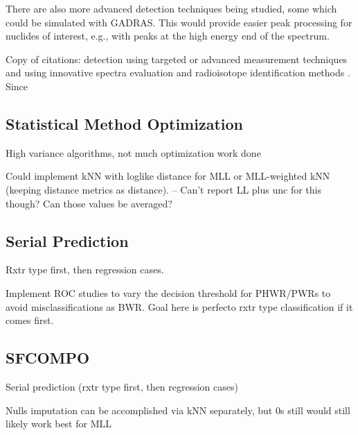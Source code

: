 There are also more advanced detection techniques being studied, some which
could be simulated with \gls{GADRAS}.  This would provide easier peak
processing for nuclides of interest, e.g., with peaks at the high energy end of
the spectrum.

Copy of citations:
detection using targeted or advanced measurement techniques \cite{snf_gamma,
compton_supp, bwr_high-res_gamma, pwr_bwr_gamma} and using innovative spectra
evaluation and radioisotope identification methods \cite{riid_09,
rapid_riid_18, sull_gen_07, sull_valid_15, sull_auto_17, sull_unc_17}.  Since

\subsection{Statistical Method Optimization}

High variance algorithms, not much optimization work done

Could implement kNN with loglike distance for MLL or MLL-weighted kNN (keeping 
distance metrics as distance). -- Can't report LL plus unc for this though? Can
those values be averaged?

\subsection{Serial Prediction}

Rxtr type first, then regression cases. 

Implement ROC studies to vary the decision threshold for PHWR/PWRs to avoid
misclassifications as BWR. Goal here is perfecto rxtr type classification if
it comes first. 

\subsection{SFCOMPO}

Serial prediction (rxtr type first, then regression cases)

Nulls imputation can be accomplished via kNN separately, but 0s still would
still likely work best for MLL

